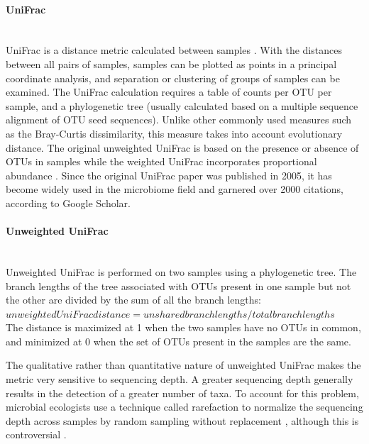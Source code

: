 \paragraph{UniFrac}\mbox{}\\
UniFrac is a distance metric calculated between samples \cite{lozupone2005unifrac}. With the distances between all pairs of samples, samples can be plotted as points in a principal coordinate analysis, and separation or clustering of groups of samples can be examined. The UniFrac calculation requires a table of counts per OTU per sample, and a phylogenetic tree (usually calculated based on a multiple sequence alignment of OTU seed sequences). Unlike other commonly used measures such as the Bray-Curtis dissimilarity, this measure takes into account evolutionary distance. The original unweighted UniFrac is based on the presence or absence of OTUs in samples \cite{lozupone2005unifrac} while the weighted UniFrac incorporates proportional abundance \cite{lozupone2007quantitative}. Since the original UniFrac paper was published in 2005, it has become widely used in the microbiome field and garnered over 2000 citations, according to Google Scholar.

\paragraph{Unweighted UniFrac}\mbox{}\\

Unweighted UniFrac is performed on two samples using a phylogenetic tree. The branch lengths of the tree associated with OTUs present in one sample but not the other are divided by the sum of all the branch lengths:\\

$unweighted UniFrac distance = unshared branch lengths / total branch lengths$\\

The distance is maximized at 1 when the two samples have no OTUs in common, and minimized at 0 when the set of OTUs present in the samples are the same.

The qualitative rather than quantitative nature of unweighted UniFrac makes the metric very sensitive to sequencing depth. A greater sequencing depth generally results in the detection of a greater number of taxa. To account for this problem, microbial ecologists use a technique called rarefaction to normalize the sequencing depth across samples by random sampling without replacement \cite{de2011evaluation}, although this is controversial \cite{mcmurdie2014waste}.

